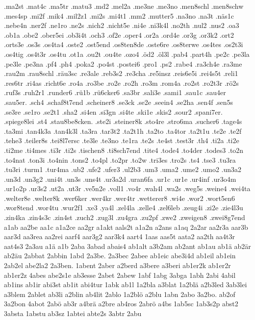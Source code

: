 {.ma2st
.mat4c
.ma5tr
.matu3
.md2
.mel2a
.me3ne
.me3no
.men8schl
.men8schw
.mes4sp
.mi2f
.mik4
.mil2z1
.mi2s
.mi4t1
.mm2
.mutter5
.na3no
.na3t
.näs1c
.nebe4n
.ner2f
.ne1ro
.ne2s
.nich2
.nicht5e
.ni4e
.ni3k4l
.no2th
.nul2
.nus2
.oa3
.ob1a
.obe2
.ober5ei
.ob3i4t
.och3
.of2e
.oper4
.or2a
.ord4e
.or3g
.or3k2
.ort2
.orts3e
.os3s
.os4ta4
.oste2
.ost5end
.os8ten8de
.oste6re
.os8terwe
.os4tes
.os2t3i
.os4tig
.os4t3r
.os4tu
.ot1a
.ou2t
.ou4te
.ozo4
.öd2
.öl3l
.pab4
.part4h
.pe2c
.pe3la
.pe3le
.pe3na
.pf4
.ph4
.poka2
.po4st
.postei6
.pro1
.ps2
.rabe4
.ra3ch4e
.ra3me
.rau2m
.rau8schl
.räu3sc
.re3ale
.reb3s2
.re3cha
.re5insz
.reis6e5i
.rei4s5t
.reli1
.res6tr
.ri4as
.richt6e
.ro4a
.ro3be
.ro2e
.ro2h
.ro3m
.rom4a
.ro2st
.ro2t3r
.rö2s
.ruf3s
.ruh2r1
.runder6
.rü1b
.rü6cker6
.sa3br
.sali3e
.sami1
.sau1c
.sau4er
.sau5er.
.sch4
.schaf8t7end
.scheiner8
.se3ck
.se2e
.seein4
.se2ha
.sen4f
.sen5s
.se3re
.se1ro
.se2t1
.sha2
.si4en
.si3gn
.si4te
.ski1e
.skis2
.sour2
.spani7er.
.spiege8lei
.st4
.stau8be8cken.
.ste2i
.steiner8k
.sto4re
.stro6ma
.sucher6
.tage4s
.ta3mi
.tan4k3a
.tan4k3l
.ta3ra
.tar3t2
.ta2t1h
.ta2to
.ta4tor
.ta2t1u
.te2e
.te2f
.tehe3
.teiler8s
.tei8l7ersc
.te3le
.te3no
.te1ra
.te2s
.te4st
.test3r
.th4
.ti2a
.ti2e
.ti2me
.ti4mes
.ti3r
.ti2s
.tischen8
.ti8sch7end
.tite4
.tode4
.to4der
.todes3
.to2n
.to4nat
.ton3i
.to4nin
.tons2
.to4pl
.to2pr
.to2w
.tri3es
.tro2s
.ts4
.tse3
.tu3ra
.tu3ri
.turm1
.tur4ma
.ub2
.ufe2
.ufer3
.ul2b3
.um3
.uma2
.ume2
.umo2
.un3a2
.un3d
.un3g2
.uni4t
.un3s
.uns4t
.ur3a2d
.uran6fa
.ur1c
.ur1e
.ur4inf
.ur3o4m
.ur1o2p
.ur3s2
.ut2a
.ut3r
.ve5n2e
.voll1
.vo4r
.wah4l
.wa2s
.weg5s
.weine4
.wei4ta
.welter8e
.welter8k
.wer6ker
.wer4kr
.wer4tr
.wetterer8
.wi4e
.wor2
.wort5en6
.wor8tend
.wor4tu
.wur2f1
.xe3
.ya4l
.zel4la
.zelle4
.zel6leb
.zeug4i
.zi2e
.zie4l3u
.zin4ka
.zin4s3c
.zin4st
.zuch2
.zug3l
.zu4gra
.zu2pf
.zwe2
.zweigen8
.zwei8g7end
a1ab
aa2be
aa1c
a1a2ce
aa2gr
a1akt
aals2t
a1a2n
a2ans
a1aq
2a2ar
aa2r3a
aar3b
aar3d
aa3rea
aa2rei
aarf4
aar3g2
aar3k4
aart4
1aas
aas5t
aata2
aa2th
aa4t3r
aat4s3
2a3au
a1ä
a1b
2aba
3abad
abais4
ab1alt
a3b2am
ab2ant
ab1au
ab1ä
ab2är
ab2äu
2abbat
2abbin
1abd
2a3be.
2a3bec
2abee
ab1eic
abe3i4d
ab1eil
ab1ein
2ab2el
abe2la2
2a3ben.
1abent
2aber
a2berd
a3bere
a3beri
ab1er2k
ab1er2r
ab1er2z
4abes
abe2s1e
ab3esse
2abet
2abew
1abf
1abg
3abga
1abh
2abi
4abil
ab1ins
ab1ir
abi3st
ab1it
abi4tur
1abk
ab1l
1a2bla
a3blat
1a2blä
a2b3led
3ab3lei
a3blem
2ablet
ab3li
a2blin
ab4lit
2ablo
1a2blö
a2blu
1abn
2abo
3a2bo.
ab2of
3a2bon
4abot
2abö
ab3r
a4brä
a2bre
ab4ros
2abrö
a4bs
1ab5sc
1ab3s2p
abst2
3absta
1abstu
ab3sz
1abtei
abte2s
3abtr
2abu
}
